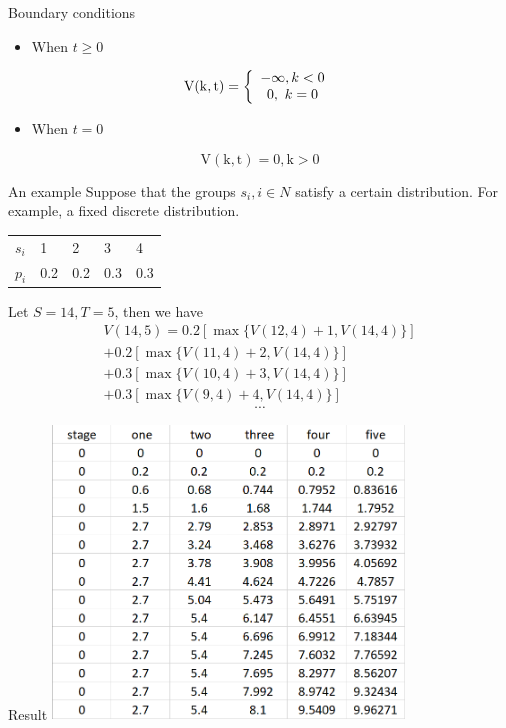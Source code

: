     \begin{frame}{Boundary conditions}
      \begin{itemize}
        \item When $t \geq 0$
      \end{itemize}

      \begin{equation*}
      \mathrm{V}(\mathrm{k}, \mathrm{t})=\left\{\begin{array}{c}
      -\infty, k<0 \\
      0,~ k=0
      \end{array} \right. \\
    \end{equation*}

      \begin{itemize}
        \item When $t = 0$
      \end{itemize}

      \begin{equation*}
        \mathrm{V}(\mathrm{k}, \mathrm{t})=0, \mathrm{k}>0
      \end{equation*}

    \end{frame}

    \begin{frame}{An example}
      Suppose that the groups $s_i, i\in N$ satisfy a certain distribution. For example, a fixed discrete distribution.

      \begin{table}[]
      \begin{tabular}{lllll}
      $s_i$ & 1   & 2   & 3   & 4   \\
      $p_i$ & 0.2 & 0.2 & 0.3 & 0.3
      \end{tabular}
      \end{table}
      \vspace{10pt}
      Let $S=14, T=5$, then we have
      \begin{align*}
      V(14,5) = 0.2[\max\{V(12,4)+1,V(14,4)\}] \\+ 0.2[\max\{V(11,4)+2, V(14,4) \}] \\+ 0.3[\max\{V(10,4)+3, V(14,4)\}] \\+ 0.3[\max\{ V(9,4)+4, V(14,4)\}]
      \end{align*}
      $$\cdots$$
    \end{frame}

    \begin{frame}{Result}
      \centering
      \includegraphics[width = 0.7\textwidth]{images/result1}
    \end{frame}


